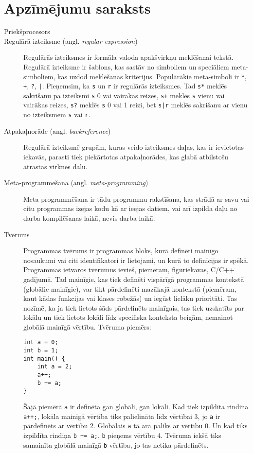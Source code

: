 \section*{Apzīmējumu saraksts}

\begin{description}
\item[Priekšprocesors]

\item[Regulārā izteiksme (angl. \emph{regular expression})]
Regulārās izteiksmes ir formāla valoda apakšvirkņu meklēšanai tekstā. Regulārā izteiksme ir šablons, kas sastāv no simboliem un speciāliem meta-simboliem, kas uzdod meklēšanas kritērijus. Populārākie meta-simboli ir \verb|*|, \verb|+|, \verb|?|, \verb/|/. Pieņemsim, ka \verb|s| un \verb|r| ir regulārās izteiksmes. Tad \verb|s*| meklēs sakrišanu pa izteiksmi \verb|s| 0 vai vairākas reizes, \verb|s+| meklēs  \verb|s| vienu vai vairākas reizes, \verb|s?| meklēs \verb|s| 0 vai 1 reizi, bet  \verb/s|r/ meklēs sakrišanu ar vienu no izteiksmēm \verb|s| vai \verb|r|.

\item[Atpakaļnorāde (angl. \emph{backreference})]
Regulārā izteiksmē grupām, kuras veido izteiksmes daļas, kas ir ievietotas iekavās, parasti tiek piekārtotas atpakaļnorādes, kas glabā atbilstošu atrastās virknes daļu.

\item[Meta-programmēšana (angl. \emph{meta-programming})]
Meta-programmēšana ir tādu programmu rakstīšana, kas strādā ar savu vai citu programmas izejas kodu kā ar ieejas datiem, vai arī izpilda daļu no darba kompilēšanas laikā, nevis darba laikā.

\item[Tvērums]
Programmas tvērums ir programmas bloks, kurā definēti mainīgo nosaukumi vai citi identifikatori ir lietojami, un kurā to definīcijas ir spēkā. Programmas ietvaros tvērumus ievieš, piemēram, figūriekavas, C/C++ gadījumā. Tad mainīgie, kas tiek definēti vispārīgā programmas kontekstā (globālie mainīgie), var tikt pārdefinēti mazākajā kontekstā (piemēram, kaut kādas funkcijas vai klases robežās) un iegūst lielāku prioritāti. Tas nozīmē, ka ja tiek lietots šāds pārdefinēts mainīgais, tas tiek uzskatīts par lokālu un tiek lietots lokāli līdz specifiska konteksta beigām, nemainot globālā mainīgā vērtību.%
Tvēruma piemērs:
\begin{verbatim}
int a = 0;
int b = 1;
int main() {
    int a = 2;
    a++;
    b += a;
}
\end{verbatim}
Šajā piemērā \verb|a| ir definēta gan globāli, gan lokāli. Kad tiek izpildīta rindiņa \verb|a++;|, lokāla mainīgā vērtība tiks palielināta līdz vērtībai 3, jo \verb|a| ir pārdefinēts ar vērtību 2. Globālais \verb|a| tā ara paliks ar vērtību 0. Un kad tiks izpildīta rindiņa \verb|b += a;|, \verb|b| pieņems vērtību 4. Tvēruma iekšā tiks samainīta globālā mainīgā \verb|b| vērtība, jo tas netika pārdefinēts.


\end{description}
